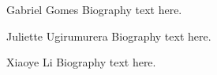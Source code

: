 
% 




\begin{IEEEbiography}{Gabriel Gomes}
Biography text here.
\end{IEEEbiography}

\begin{IEEEbiographynophoto}{Juliette Ugirumurera}
Biography text here.
\end{IEEEbiographynophoto}


\begin{IEEEbiographynophoto}{Xiaoye Li}
Biography text here.
\end{IEEEbiographynophoto}





